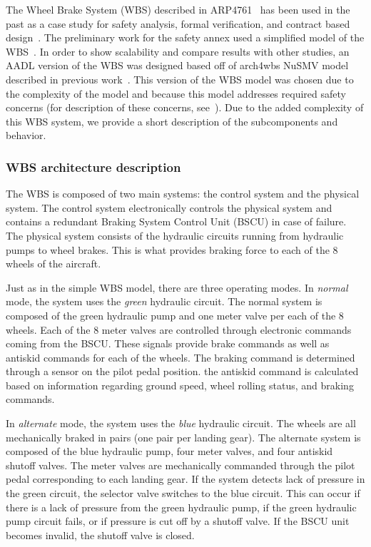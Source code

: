 The Wheel Brake System (WBS) described in ARP4761~\cite{SAE:ARP4761} has been used in the past as a case study for safety analysis, formal verification, and contract based design~\cite{DBLP:conf/cav/BozzanoCPJKPRT15, 10.1007/978-3-319-11936-6-7, CAV2015:BoCiGrMa, Stewart17:IMBSA, propBasedProofSys, Joshi05:SafeComp, NasaRep:MBSA-Aug05}. The preliminary work for the safety annex used a simplified model of the WBS~\cite{Stewart17:IMBSA}. In order to show scalability and compare results with other studies, an AADL version of the WBS was designed based off of arch4wbs NuSMV model described in previous work~\cite{DBLP:conf/cav/BozzanoCPJKPRT15}. This version of the WBS model was chosen due to the complexity of the model and because this model addresses required safety concerns (for description of these concerns, see~\cite{DBLP:conf/cav/BozzanoCPJKPRT15}). Due to the added complexity of this WBS system, we provide a short description of the subcomponents and behavior. 

\subsubsection{WBS architecture description} 
The WBS is composed of two main systems: the control system and the physical system. The control system electronically controls the physical system and contains a redundant Braking System Control Unit (BSCU) in case of failure. The physical system consists of the hydraulic circuits running from hydraulic pumps to wheel brakes. This is what provides braking force to each of the 8 wheels of the aircraft. 

Just as in the simple WBS model, there are three operating modes. In \textit{normal} mode, the system uses the \textit{green} hydraulic circuit. The normal system is composed of the green hydraulic pump and one meter valve per each of the 8 wheels. Each of the 8 meter valves are controlled through electronic commands coming from the BSCU. These signals provide brake commands as well as antiskid commands for each of the wheels. The braking command is determined through a sensor on the pilot pedal position. the antiskid command is calculated based on information regarding ground speed, wheel rolling status, and braking commands. 

In \textit{alternate} mode, the system uses the \textit{blue} hydraulic circuit.  The wheels are all mechanically braked in pairs (one pair per landing gear). The alternate system is composed of the blue hydraulic pump, four meter valves, and four antiskid shutoff valves. The meter valves are mechanically commanded through the pilot pedal corresponding to each landing gear. If the system detects lack of pressure in the green circuit, the selector valve switches to the blue circuit. This can occur if there is a lack of pressure from the green hydraulic pump, if the green hydraulic pump circuit fails, or if pressure is cut off by a shutoff valve. If the BSCU unit becomes invalid, the shutoff valve is closed. 

